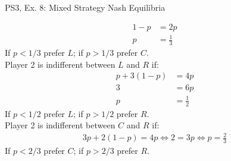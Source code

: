 \begin{frame}{PS3, Ex. 8: Mixed Strategy Nash Equilibria}
\begin{multicols}{2}
\begin{align*}
      1-p     &= 2p \\
      p       &= \frac{1}{3}
    \end{align*}
    If $p<1/3$ prefer $L$; if $p>1/3$ prefer $C$.\\\medskip
    Player 2 is indifferent between $L$ and $R$ if:
    \begin{align*}
      p+3(1-p)&= 4p \\
      3       &= 6p \\
      p       &= \frac{1}{2}
    \end{align*}
    If $p<1/2$ prefer $L$; if $p>1/2$ prefer $R$.\\\medskip
    Player 2 is indifferent between $C$ and $R$ if:
    \begin{align*}
      3p+2(1-p) = 4p \Leftrightarrow 2 = 3p \Leftrightarrow p = \frac{2}{3}
    \end{align*}
    If $p<2/3$ prefer $C$; if $p>2/3$ prefer $R$.\\\medskip
  \vfill\null
  \end{multicols}
\end{frame}
